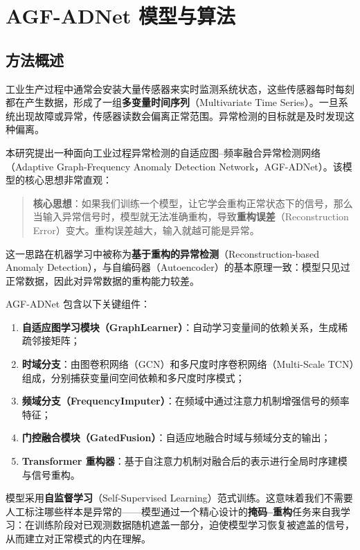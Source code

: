 \documentclass[UTF8]{ctexart}
\begin{document}
\section{AGF-ADNet 模型与算法}

\subsection{方法概述}

工业生产过程中通常会安装大量传感器来实时监测系统状态，这些传感器每时每刻都在产生数据，形成了一组\textbf{多变量时间序列}（Multivariate Time Series）。一旦系统出现故障或异常，传感器读数会偏离正常范围。异常检测的目标就是及时发现这种偏离。

本研究提出一种面向工业过程异常检测的自适应图--频率融合异常检测网络（Adaptive Graph-Frequency Anomaly Detection Network，AGF-ADNet）。该模型的核心思想非常直观：

\begin{quote}
\textbf{核心思想}：如果我们训练一个模型，让它学会重构正常状态下的信号，那么当输入异常信号时，模型就无法准确重构，导致\textbf{重构误差}（Reconstruction Error）变大。重构误差越大，输入就越可能是异常。
\end{quote}

这一思路在机器学习中被称为\textbf{基于重构的异常检测}（Reconstruction-based Anomaly Detection），与自编码器（Autoencoder）的基本原理一致：模型只见过正常数据，因此对异常数据的重构能力较差。

AGF-ADNet 包含以下关键组件：
\begin{enumerate}
    \item \textbf{自适应图学习模块（GraphLearner）}：自动学习变量间的依赖关系，生成稀疏邻接矩阵；
    \item \textbf{时域分支}：由图卷积网络（GCN）和多尺度时序卷积网络（Multi-Scale TCN）组成，分别捕获变量间空间依赖和多尺度时序模式；
    \item \textbf{频域分支（FrequencyImputer）}：在频域中通过注意力机制增强信号的频率特征；
    \item \textbf{门控融合模块（GatedFusion）}：自适应地融合时域与频域分支的输出；
    \item \textbf{Transformer 重构器}：基于自注意力机制对融合后的表示进行全局时序建模与信号重构。
\end{enumerate}

模型采用\textbf{自监督学习}（Self-Supervised Learning）范式训练。这意味着我们不需要人工标注哪些样本是异常的——模型通过一个精心设计的\textbf{掩码--重构}任务来自我学习：在训练阶段对已观测数据随机遮盖一部分，迫使模型学习恢复被遮盖的信号，从而建立对正常模式的内在理解。
\end{document}

